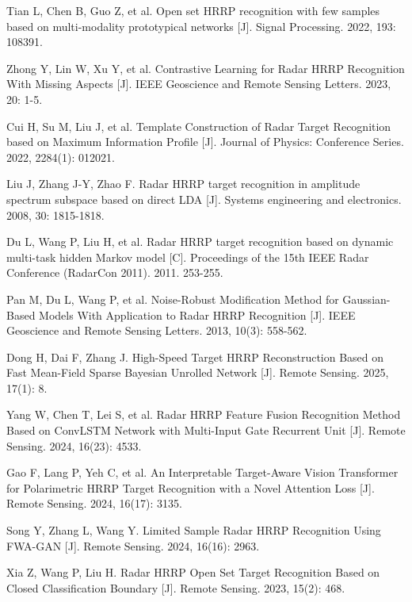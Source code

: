 \documentclass[doctor,twoside,ttf]{nudtpaper}
\begin{document}
\begin{thebibliography}{99}
 Tian L, Chen B, Guo Z, et al. Open set HRRP recognition with few samples based on multi-modality prototypical networks [J]. Signal Processing. 2022, 193: 108391.

 Zhong Y, Lin W, Xu Y, et al. Contrastive Learning for Radar HRRP Recognition With Missing Aspects [J]. IEEE Geoscience and Remote Sensing Letters. 2023, 20: 1-5.

 Cui H, Su M, Liu J, et al. Template Construction of Radar Target Recognition based on Maximum Information Profile [J]. Journal of Physics: Conference Series. 2022, 2284(1): 012021.

 Liu J, Zhang J-Y, Zhao F. Radar HRRP target recognition in amplitude spectrum subspace based on direct LDA [J]. Systems engineering and electronics. 2008, 30: 1815-1818.

 Du L, Wang P, Liu H, et al. Radar HRRP target recognition based on dynamic multi-task hidden Markov model [C]. Proceedings of the 15th IEEE Radar Conference (RadarCon 2011). 2011. 253-255.

 Pan M, Du L, Wang P, et al. Noise-Robust Modification Method for Gaussian-Based Models With Application to Radar HRRP Recognition [J]. IEEE Geoscience and Remote Sensing Letters. 2013, 10(3): 558-562.

 Dong H, Dai F, Zhang J. High-Speed Target HRRP Reconstruction Based on Fast Mean-Field Sparse Bayesian Unrolled Network [J]. Remote Sensing. 2025, 17(1): 8.

 Yang W, Chen T, Lei S, et al. Radar HRRP Feature Fusion Recognition Method Based on ConvLSTM Network with Multi-Input Gate Recurrent Unit [J]. Remote Sensing. 2024, 16(23): 4533.

 Gao F, Lang P, Yeh C, et al. An Interpretable Target-Aware Vision Transformer for Polarimetric HRRP Target Recognition with a Novel Attention Loss [J]. Remote Sensing. 2024, 16(17): 3135.

 Song Y, Zhang L, Wang Y. Limited Sample Radar HRRP Recognition Using FWA-GAN [J]. Remote Sensing. 2024, 16(16): 2963.

 Xia Z, Wang P, Liu H. Radar HRRP Open Set Target Recognition Based on Closed Classification Boundary [J]. Remote Sensing. 2023, 15(2): 468.


\end{thebibliography}
\end{document}
